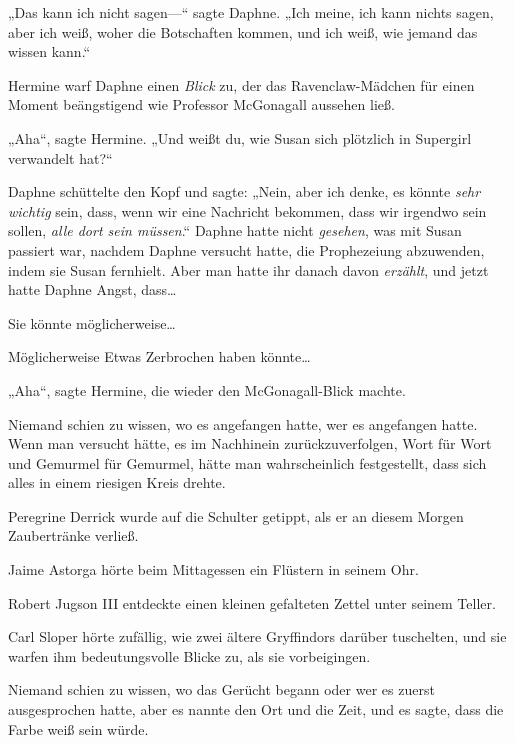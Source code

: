 {„Das kann ich nicht sagen—“ sagte Daphne. „Ich meine, ich kann nichts sagen, aber ich weiß, woher die Botschaften kommen, und ich weiß, wie jemand das wissen kann.“

Hermine warf Daphne einen \emph{Blick} zu, der das Ravenclaw-Mädchen für einen Moment beängstigend wie Professor McGonagall aussehen ließ.

„Aha“, sagte Hermine. „Und weißt du, wie Susan sich plötzlich in Supergirl verwandelt hat?“

Daphne schüttelte den Kopf und sagte: „Nein, aber ich denke, es könnte \emph{sehr wichtig} sein, dass, wenn wir eine Nachricht bekommen, dass wir irgendwo sein sollen, \emph{alle dort sein müssen}.“ Daphne hatte nicht \emph{gesehen}, was mit Susan passiert war, nachdem Daphne versucht hatte, die Prophezeiung abzuwenden, indem sie Susan fernhielt. Aber man hatte ihr danach davon \emph{erzählt}, und jetzt hatte Daphne Angst, dass…

Sie könnte möglicherweise…

Möglicherweise Etwas Zerbrochen haben könnte…

„Aha“, sagte Hermine, die wieder den McGonagall-Blick machte.

Niemand schien zu wissen, wo es angefangen hatte, wer es angefangen hatte. Wenn man versucht hätte, es im Nachhinein zurückzuverfolgen, Wort für Wort und Gemurmel für Gemurmel, hätte man wahrscheinlich festgestellt, dass sich alles in einem riesigen Kreis drehte.

Peregrine Derrick wurde auf die Schulter getippt, als er an diesem Morgen Zaubertränke verließ.

Jaime Astorga hörte beim Mittagessen ein Flüstern in seinem Ohr.

Robert Jugson III entdeckte einen kleinen gefalteten Zettel unter seinem Teller.

Carl Sloper hörte zufällig, wie zwei ältere Gryffindors darüber tuschelten, und sie warfen ihm bedeutungsvolle Blicke zu, als sie vorbeigingen.

Niemand schien zu wissen, wo das Gerücht begann oder wer es zuerst ausgesprochen hatte, aber es nannte den Ort und die Zeit, und es sagte, dass die Farbe weiß sein würde.

}

